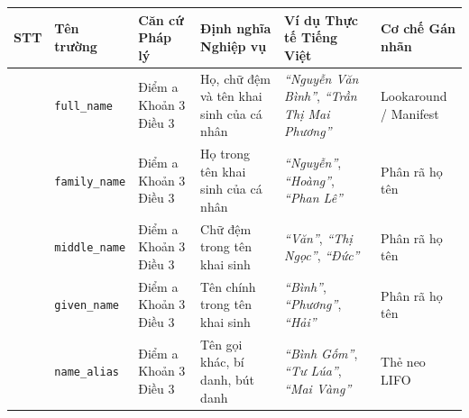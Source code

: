 \documentclass[
  11pt,
  a4paper,
]{article}
\newcounter{none} %
\begin{document}
{\def\LTcaptype{none} %
\begin{longtable}[]{@{}
  >{\centering\arraybackslash}p{}
  >{\raggedright\arraybackslash}p{}
  >{\raggedright\arraybackslash}p{}
  >{\raggedright\arraybackslash}p{}
  >{\raggedright\arraybackslash}p{}
  >{\raggedright\arraybackslash}p{}@{}}
\toprule\noalign{}
\begin{minipage}[b]{\linewidth}\centering
STT
\end{minipage} & \begin{minipage}[b]{\linewidth}\raggedright
Tên trường
\end{minipage} & \begin{minipage}[b]{\linewidth}\raggedright
Căn cứ Pháp lý
\end{minipage} & \begin{minipage}[b]{\linewidth}\raggedright
Định nghĩa Nghiệp vụ
\end{minipage} & \begin{minipage}[b]{\linewidth}\raggedright
Ví dụ Thực tế Tiếng Việt
\end{minipage} & \begin{minipage}[b]{\linewidth}\raggedright
Cơ chế Gán nhãn
\end{minipage} \\
\midrule\noalign{}
\endhead
\bottomrule\noalign{}
\endlastfoot
1 & \texttt{full\_name} & Điểm a Khoản 3 Điều 3 & Họ, chữ đệm và tên khai sinh của cá nhân &
\emph{``Nguyễn Văn Bình''}, \emph{``Trần Thị Mai Phương''} & Lookaround / Manifest \\
2 & \texttt{family\_name} & Điểm a Khoản 3 Điều 3 & Họ trong tên khai sinh của cá nhân &
\emph{``Nguyễn''}, \emph{``Hoàng''}, \emph{``Phan Lê''} & Phân rã họ tên \\
3 & \texttt{middle\_name} & Điểm a Khoản 3 Điều 3 & Chữ đệm trong tên khai sinh & \emph{``Văn''},
\emph{``Thị Ngọc''}, \emph{``Đức''} & Phân rã họ tên \\
4 & \texttt{given\_name} & Điểm a Khoản 3 Điều 3 & Tên chính trong tên khai sinh & \emph{``Bình''},
\emph{``Phương''}, \emph{``Hải''} & Phân rã họ tên \\
5 & \texttt{name\_alias} & Điểm a Khoản 3 Điều 3 & Tên gọi khác, bí danh, bút danh & \emph{``Bình
Gốm''}, \emph{``Tư Lúa''}, \emph{``Mai Vàng''} & Thẻ neo LIFO \\

\end{longtable}}
\end{document}
